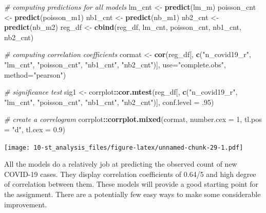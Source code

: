 \documentclass[
]{book}
\newenvironment{Shaded}{\begin{snugshade}}{\end{snugshade}}
\newcommand{\CommentTok}[1]{\textcolor[rgb]{0.56,0.35,0.01}{\textit{#1}}}
\newcommand{\DataTypeTok}[1]{\textcolor[rgb]{0.13,0.29,0.53}{#1}}
\newcommand{\DecValTok}[1]{\textcolor[rgb]{0.00,0.00,0.81}{#1}}
\newcommand{\FloatTok}[1]{\textcolor[rgb]{0.00,0.00,0.81}{#1}}
\newcommand{\KeywordTok}[1]{\textcolor[rgb]{0.13,0.29,0.53}{\textbf{#1}}}
\newcommand{\NormalTok}[1]{#1}
\newcommand{\OperatorTok}[1]{\textcolor[rgb]{0.81,0.36,0.00}{\textbf{#1}}}
\newcommand{\StringTok}[1]{\textcolor[rgb]{0.31,0.60,0.02}{#1}}
\begin{document}
\begin{Shaded}
\begin{Highlighting}[]
\CommentTok{# computing predictions for all models}
\NormalTok{lm_cnt <-}\StringTok{ }\KeywordTok{predict}\NormalTok{(lm_m)}
\NormalTok{poisson_cnt <-}\StringTok{ }\KeywordTok{predict}\NormalTok{(poisson_m1)}
\NormalTok{nb1_cnt <-}\StringTok{ }\KeywordTok{predict}\NormalTok{(nb_m1)}
\NormalTok{nb2_cnt <-}\StringTok{ }\KeywordTok{predict}\NormalTok{(nb_m2)}
\NormalTok{reg_df <-}\StringTok{ }\KeywordTok{cbind}\NormalTok{(reg_df, lm_cnt, poisson_cnt, nb1_cnt, nb2_cnt)}

\CommentTok{# computing correlation coefficients}
\NormalTok{cormat <-}\StringTok{ }\KeywordTok{cor}\NormalTok{(reg_df[, }\KeywordTok{c}\NormalTok{(}\StringTok{"n_covid19_r"}\NormalTok{, }\StringTok{"lm_cnt"}\NormalTok{, }\StringTok{"poisson_cnt"}\NormalTok{, }\StringTok{"nb1_cnt"}\NormalTok{, }\StringTok{"nb2_cnt"}\NormalTok{)], }
              \DataTypeTok{use=}\StringTok{"complete.obs"}\NormalTok{, }
              \DataTypeTok{method=}\StringTok{"pearson"}\NormalTok{)}

\CommentTok{# significance test}
\NormalTok{sig1 <-}\StringTok{ }\NormalTok{corrplot}\OperatorTok{::}\KeywordTok{cor.mtest}\NormalTok{(reg_df[, }\KeywordTok{c}\NormalTok{(}\StringTok{"n_covid19_r"}\NormalTok{, }\StringTok{"lm_cnt"}\NormalTok{, }\StringTok{"poisson_cnt"}\NormalTok{, }\StringTok{"nb1_cnt"}\NormalTok{, }\StringTok{"nb2_cnt"}\NormalTok{)],}
                            \DataTypeTok{conf.level =} \FloatTok{.95}\NormalTok{)}

\CommentTok{# create a correlogram}
\NormalTok{corrplot}\OperatorTok{::}\KeywordTok{corrplot.mixed}\NormalTok{(cormat,}
                         \DataTypeTok{number.cex =} \DecValTok{1}\NormalTok{,}
                         \DataTypeTok{tl.pos =} \StringTok{"d"}\NormalTok{,}
                         \DataTypeTok{tl.cex =} \FloatTok{0.9}\NormalTok{)}
\end{Highlighting}
\end{Shaded}

\texttt{[image: 10-st\_analysis\_files/figure-latex/unnamed-chunk-29-1.pdf]}

All the models do a relatively job at predicting the observed count of new COVID-19 cases. They display correlation coefficients of 0.64/5 and high degree of correlation between them. These models will provide a good starting point for the assignment. There are a potentially few easy ways to make some considerable improvement.
\end{document}
